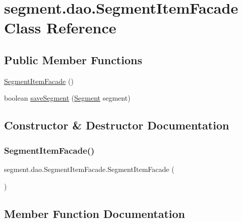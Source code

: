 \hypertarget{classsegment_1_1dao_1_1_segment_item_facade}{}\section{segment.\+dao.\+Segment\+Item\+Facade Class Reference}
\label{classsegment_1_1dao_1_1_segment_item_facade}
\subsection*{Public Member Functions}
\begin{DoxyCompactItemize}
\item 
\mbox{\hyperlink{classsegment_1_1dao_1_1_segment_item_facade_aa023ae925e8d7d3d096f3d43d1b36c2e}{Segment\+Item\+Facade}} ()
\item 
boolean \mbox{\hyperlink{classsegment_1_1dao_1_1_segment_item_facade_a8e3e0e8f81f5e81d5715c9e1cdfa535b}{save\+Segment}} (\mbox{\hyperlink{classclases_1_1_segment}{Segment}} segment)
\end{DoxyCompactItemize}


\subsection{Constructor \& Destructor Documentation}
\mbox{\label{classsegment_1_1dao_1_1_segment_item_facade_aa023ae925e8d7d3d096f3d43d1b36c2e}} 
\subsubsection{\texorpdfstring{Segment\+Item\+Facade()}{SegmentItemFacade()}}
{\footnotesize\ttfamily segment.\+dao.\+Segment\+Item\+Facade.\+Segment\+Item\+Facade (\begin{DoxyParamCaption}{ }\end{DoxyParamCaption})}



\subsection{Member Function Documentation}
\mbox{\label{classsegment_1_1dao_1_1_segment_item_facade_a8e3e0e8f81f5e81d5715c9e1cdfa535b}} 
